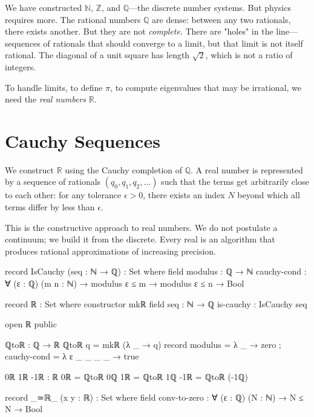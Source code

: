 \documentclass[11pt,a4paper]{book}
\begin{document}
We have constructed $\mathbb{N}$, $\mathbb{Z}$, and $\mathbb{Q}$—the discrete number systems. 
But physics requires more. The rational numbers $\mathbb{Q}$ are dense: between any two 
rationals, there exists another. But they are not \emph{complete}. There are "holes" in the 
line—sequences of rationals that should converge to a limit, but that limit is not itself 
rational. The diagonal of a unit square has length $\sqrt{2}$, which is not a ratio of integers.

To handle limits, to define $\pi$, to compute eigenvalues that may be irrational, we need 
the \emph{real numbers} $\mathbb{R}$.

\section{Cauchy Sequences}

We construct $\mathbb{R}$ using the Cauchy completion of $\mathbb{Q}$. A real number is 
represented by a sequence of rationals $(q_0, q_1, q_2, \ldots)$ such that the terms get 
arbitrarily close to each other: for any tolerance $\epsilon > 0$, there exists an index 
$N$ beyond which all terms differ by less than $\epsilon$.

This is the constructive approach to real numbers. We do not postulate a continuum; we 
build it from the discrete. Every real is an algorithm that produces rational approximations 
of increasing precision.

\begin{code}
record IsCauchy (seq : ℕ → ℚ) : Set where
  field
    modulus : ℚ → ℕ
    cauchy-cond : ∀ (ε : ℚ) (m n : ℕ) → 
                  modulus ε ≤ m → modulus ε ≤ n → Bool

record ℝ : Set where
  constructor mkℝ
  field
    seq : ℕ → ℚ
    is-cauchy : IsCauchy seq

open ℝ public

ℚtoℝ : ℚ → ℝ
ℚtoℝ q = mkℝ (λ _ → q) record 
  { modulus = λ _ → zero
  ; cauchy-cond = λ ε _ _ _ _ → true
  }

0ℝ 1ℝ -1ℝ : ℝ
0ℝ  = ℚtoℝ 0ℚ
1ℝ  = ℚtoℝ 1ℚ
-1ℝ = ℚtoℝ (-1ℚ)

record _≃ℝ_ (x y : ℝ) : Set where
  field
    conv-to-zero : ∀ (ε : ℚ) (N : ℕ) → N ≤ N → Bool
\end{code}
\end{document}
